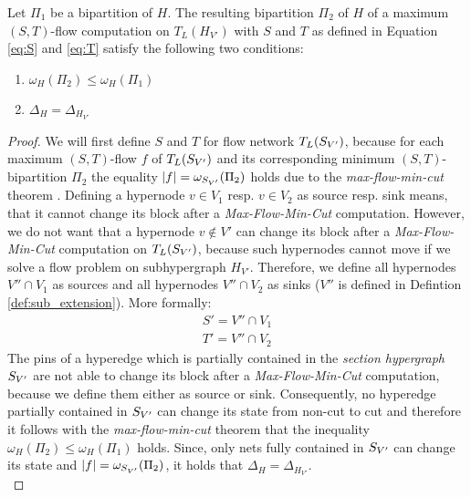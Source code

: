 \begin{theorem}
\label{theorem:ST}
Let $\Pi_1$ be a bipartition of $H$. The resulting bipartition $\Pi_2$ 
of $H$ of a maximum $(S,T)$-flow computation on $T_L(H_{V'})$ with
$S$ and $T$ as defined in Equation \ref{eq:S} and \ref{eq:T} satisfy the following two
conditions:
\begin{enumerate}
\item $\omega_H(\Pi_2) \le \omega_H(\Pi_1)$
\item $\Delta_H = \Delta_{H_{V'}}$
\end{enumerate}
\end{theorem}

\begin{proof}
We will first define $S$ and $T$ for flow network
$T_L(S_{V'})$, because for each maximum $(S,T)$-flow $f$ of $T_L(S_{V'})$
and its corresponding minimum $(S,T)$-bipartition $\Pi_2$ the equality 
$|f| = \omega_{S_{V'}}(\Pi_2)$ holds due to the 
\emph{max-flow-min-cut} theorem \cite{ford1956maximal}. 
Defining a hypernode $v \in V_1$ resp. $v \in V_2$ as source resp. sink means, that
it cannot change its block after a \emph{Max-Flow-Min-Cut} computation.
However, we do not want that a hypernode $v \notin V'$ can change its block after
a \emph{Max-Flow-Min-Cut} computation on $T_L(S_{V'})$, because such hypernodes
cannot move if we solve a flow problem on subhypergraph $H_{V'}$. Therefore, we define
all hypernodes $V'' \cap V_1$ as sources and all hypernodes $V'' \cap V_2$ as sinks 
($V''$ is defined in Defintion \ref{def:sub_extension}). More formally:
\begin{align*}
S' = V'' \cap V_1 \\
T' = V'' \cap V_2 
\end{align*}
The pins of a hyperedge which is partially contained in the \emph{section hypergraph}
$S_{V'}$ are not able to change its block after a \emph{Max-Flow-Min-Cut}
computation, because we define them either as source or sink. Consequently, 
no hyperedge partially contained in $S_{V'}$ can change its state 
from non-cut to cut and therefore it follows with the \emph{max-flow-min-cut} 
theorem \cite{ford1956maximal} that the inequality $\omega_H(\Pi_2) \le \omega_H(\Pi_1)$
holds. Since, only nets fully contained in $S_{V'}$ can change its state and
$|f| = \omega_{S_{V'}}(\Pi_2)$, it holds that
$\Delta_H = \Delta_{H_{V'}}$. \\

\end{proof}

